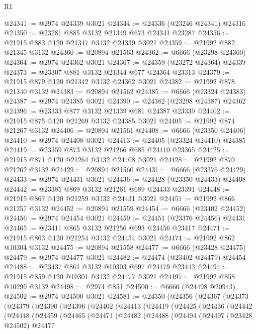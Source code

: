 \begin{lexlean}{R1}
\begin{coremodule}
@24341 := @2974 @24339 @3021
@24344 := @24336 (@23246 @24341) @24316
@24350 := @23281 @885 @3132 @21349 @673 @24341 @23287
@24356 := @21915 @883 @120 @21347 @3132 @24339 @3021
@24359 := @21992 @882 @21345 @3132
@24360 := @20894 @21563
@24362 := @6666 (@23298 @24360)
@24364 := @2974 @24362 @3021
@24367 := @24359 (@23272 @24364) @24339
@24373 := @23307 @881 @3132 @21344 @677 @24364 @23313
@24379 := @21915 @879 @120 @21342 @3132 @24362 @3021
@24382 := @21992 @878 @21340 @3132
@24383 := @20894 @21562
@24385 := @6666 (@23324 @24383)
@24387 := @2974 @24385 @3021
@24390 := @24382 (@23298 @24387) @24362
@24396 := @23333 @877 @3132 @21339 @681 @24387 @23339
@24402 := @21915 @875 @120 @21269 @3132 @24385 @3021
@24405 := @21992 @874 @21267 @3132
@24406 := @20894 @21561
@24408 := @6666 (@23350 @24406)
@24410 := @2974 @24408 @3021
@24413 := @24405 (@23324 @24410) @24385
@24419 := @23359 @873 @3132 @21266 @685 @24410 @23365
@24425 := @21915 @871 @120 @21264 @3132 @24408 @3021
@24428 := @21992 @870 @21262 @3132
@24429 := @20894 @21560
@24431 := @6666 (@23376 @24429)
@24433 := @2974 @24431 @3021
@24436 := @24428 (@23350 @24433) @24408
@24442 := @23385 @869 @3132 @21261 @689 @24433 @23391
@24448 := @21915 @867 @120 @21259 @3132 @24431 @3021
@24451 := @21992 @866 @21257 @3132
@24452 := @20894 @21559
@24454 := @6666 (@23402 @24452)
@24456 := @2974 @24454 @3021
@24459 := @24451 (@23376 @24456) @24431
@24465 := @23411 @865 @3132 @21256 @693 @24456 @23417
@24471 := @21915 @863 @120 @21254 @3132 @24454 @3021
@24474 := @21992 @862 @10304 @3132
@24475 := @20894 @21558
@24477 := @6666 (@23428 @24475)
@24479 := @2974 @24477 @3021
@24482 := @24474 (@23402 @24479) @24454
@24488 := @23437 @861 @3132 @10303 @697 @24479 @23443
@24494 := @21915 @859 @120 @10301 @3132 @24477 @3021
@24497 := @21992 @858 @10299 @3132
@24498 := @2974 @851
@24500 := @6666 (@24498 @20943)
@24502 := @2974 @24500 @3021
@24581 := @24350
    (@24356
      (@24367
        (@24373
          (@24379
            (@24390
              (@24396
                (@24402
                  (@24413
                    (@24419
                      (@24425
                        (@24436
                          (@24442
                            (@24448
                              (@24459
                                (@24465
                                  (@24471
                                    (@24482
                                      (@24488
                                        (@24494
                                          (@24497
                                            (@23428 @24502)
                                            @24477

\end{coremodule}
\end{lexlean}
